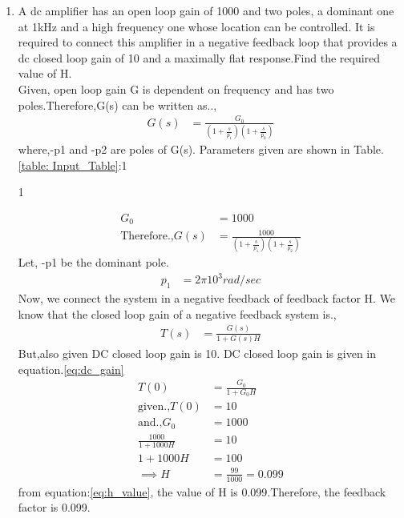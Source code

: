 \begin{enumerate}[label=\thesubsection.\arabic*.,ref=\thesubsection.\theenumi]

\item
A dc amplifier has an open loop gain of 1000 and two poles, a dominant one at 1kHz and a high frequency one whose location can be controlled. It is required to connect this amplifier in a negative feedback loop that provides a dc closed loop gain of 10 and a maximally flat response.Find the required value of H.
\\
\solution Given, open loop gain G is dependent on frequency and has two poles.Therefore,G(s) can be written as..,
\begin{align}
  G(s) &= \frac{G_0}{(1+\frac{s}{p_{1}})(1+\frac{s}{p_{2}})} \label{eq:open_loop_gain} 
\end{align}
where,-p1 and -p2 are poles of G(s).
Parameters given are shown in Table.\ref{table: Input_Table}:1
\begin{table}[!ht]
\centering

\caption{1}
\label{table: Input_Table}
\end{table}
\begin{align}
    G_0 &= 1000\\
\text{Therefore.,} G(s)&= \frac{1000}{(1+\frac{s}{p_{1}})(1+\frac{s}{p_{2}})}  
\end{align}
Let, -p1 be the dominant pole.
\begin{align}
    p_1 &= 2\pi10^3 rad/sec
\end{align}
Now, we connect the system in a negative feedback of feedback factor H.
We know that the closed loop gain of a negative feedback system is.,
\begin{align}
    T(s) &= \frac{G(s)}{1+G(s)H} \label{eq:transfer_function}
\end{align}
But,also given DC closed loop gain is 10. DC closed loop gain is given in equation.\ref{eq:dc_gain} 
\begin{align}
T(0) &= \frac{G_0}{1+G_0H} \label{eq:dc_gain} \\
\text{given.,}T(0)&=10\\
\text{and.,}G_0 &= 1000\\
\frac{1000}{1+1000H} &= 10\\
1+1000H &= 100\\
\implies H &= \frac{99}{1000} = 0.099 \label{eq:h_value}
\end{align}
from equation:\ref{eq:h_value}, the value of H is 0.099.Therefore, the feedback factor is 0.099.

\end{enumerate}
